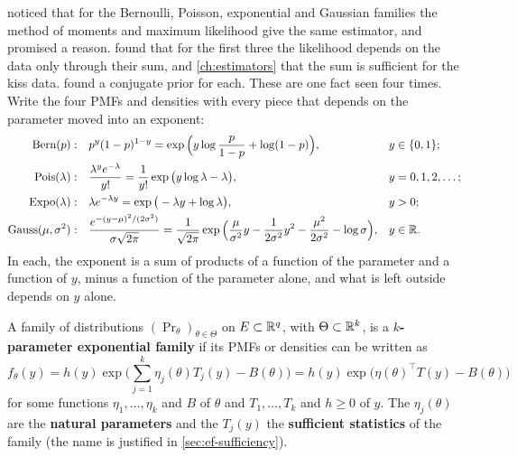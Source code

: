  noticed that for the Bernoulli, Poisson, exponential and Gaussian families the method of moments and maximum likelihood give the same estimator, and promised a reason.
 found that for the first three the likelihood depends on the data only through their sum, and \cref{ch:estimators} that the sum is sufficient for the kiss data.
 found a conjugate prior for each.
These are one fact seen four times.
Write the four PMFs and densities with every piece that depends on the parameter moved into an exponent:
\begin{align*}
\text{Bern}(p): \quad & p^y(1-p)^{1-y} = \exp\Big(y\log\frac{p}{1-p} + \log(1 - p)\Big), && y \in \{0, 1\}; \\
\text{Pois}(\lambda): \quad & \frac{\lambda^y e^{-\lambda}}{y!} = \frac{1}{y!}\exp\big(y\log\lambda - \lambda\big), && y = 0, 1, 2, \ldots; \\
\text{Expo}(\lambda): \quad & \lambda e^{-\lambda y} = \exp\big(-\lambda y + \log\lambda\big), && y > 0; \\
\text{Gauss}(\mu, \sigma^2): \quad & \frac{e^{-(y - \mu)^2/(2\sigma^2)}}{\sigma\sqrt{2\pi}} = \frac{1}{\sqrt{2\pi}}\exp\Big(\frac{\mu}{\sigma^2}y - \frac{1}{2\sigma^2}y^2 - \frac{\mu^2}{2\sigma^2} - \log\sigma\Big), && y \in \mathbb{R}.
\end{align*}
In each, the exponent is a sum of products of a function of the parameter and a function of $y$, minus a function of the parameter alone, and what is left outside depends on $y$ alone.

\begin{definition}
\label{def:expfam}
A family of distributions $(\Pr_\theta)_{\theta \in \Theta}$ on $E \subset \mathbb{R}^q$, with $\Theta \subset \mathbb{R}^k$, is a \textbf{$k$-parameter exponential family} if its PMFs or densities can be written as
\[
f_\theta(y) = h(y)\exp\Big(\sum_{j=1}^k \eta_j(\theta)T_j(y) - B(\theta)\Big) = h(y)\exp\big(\eta(\theta)^\top T(y) - B(\theta)\big)
\]
for some functions $\eta_1, \ldots, \eta_k$ and $B$ of $\theta$ and $T_1, \ldots, T_k$ and $h \geq 0$ of $y$.
The $\eta_j(\theta)$ are the \textbf{natural parameters} and the $T_j(y)$ the \textbf{sufficient statistics} of the family (the name is justified in \cref{sec:ef-sufficiency}).
\end{definition}

